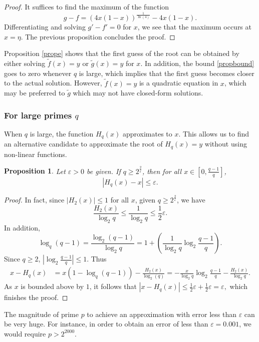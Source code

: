 \documentclass{article}
\newtheorem{proposition}[theorem]{Proposition}%
\begin{document}
\begin{proof}
	It suffices to find the maximum of the function 
	\[
	g-f = (4x(1-x))^{\frac{1}{\ln(4)}}-4x(1-x).
	\]
	Differentiating and solving $g'-f'=0$ for $x$, we see that the maximum occurs at $x=\eta$. The previous proposition concludes the proof. 
\end{proof}

Proposition \ref{prope} shows that the first guess  of the root can be obtained by either solving $\tilde{f}(x)=y$ or $\tilde{g}(x)=y$ for $x$. In addition, the bound \eqref{propbound} goes to zero whenever $q$ is large, which implies that the first guess becomes closer to the actual solution. However, $\tilde{f}(x)=y$ is a quadratic equation in $x$, which may be preferred to $\tilde{g}$ which may not have closed-form solutions.

\subsubsection{For large primes $q$}
When $q$ is large, the function $H_{q}(x)$ approximates to $x$. This allows us to find an alternative candidate to approximate the root of $H_{q}(x)=y$ without using non-linear functions. 
\medskip
\begin{proposition}\label{prop402}
Let $\varepsilon>0$ be given. If $q\geq 2^{\frac{2}{\varepsilon}}$, then for all $x\in [0,\frac{q-1}{q}]$,
\[
\left|H_{q}(x)-x\right|\leq \varepsilon.
\]
\end{proposition}

\begin{proof}
In fact, since $|H_{2}(x)|\leq 1$ for all $x$, given $q\geq 2^{\frac{2}{\varepsilon}}$, we have 
\[
\frac{H_{2}(x)}{\log_{2}q}\leq \frac{1}{\log_{2} q}\leq \frac{1}{2}\varepsilon.
\]
In addition, 
\[
\log_{q}(q-1)=\frac{\log_{2}(q-1)}{\log_{2} q}=1+\left(\frac{1}{\log_{2} q}\log_{2}\frac{q-1}{q}\right).
\]
Since $q\geq 2$, $|\log_{2}\frac{q-1}{q}|\leq 1$. Thus 
\begin{align*}
x-H_{q}(x) &= x(1-\log_{q}(q-1)) - \frac{H_{2}(x)}{\log_{2}(q)}
= -\frac{x}{\log_{2} q}\log_{2}\frac{q-1}{q}-\frac{H_{2}(x)}{\log_{2} q}.
\end{align*}
As $x$ is bounded above by $1$, it follows that 
$
|x-H_{q}(x)|\leq \frac{1}{2}\varepsilon + \frac{1}{2}\varepsilon = \varepsilon,
$
which finishes the proof. 
\end{proof}

The magnitude of prime $p$ to achieve an approximation with error less than $\varepsilon$ can be very huge. For instance, in order to obtain an error of less than $\varepsilon=0.001$, we would require $p>2^{2000}$.
\end{document}

